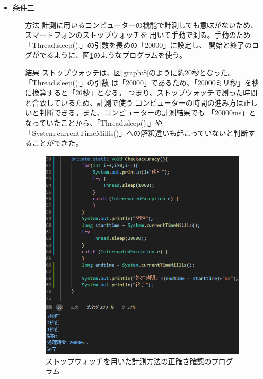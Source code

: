 \begin{enumerate}
\begin{itemize}
\begin{itemize}
\begin{figure}[htbp]
\begin{minipage}[t]{0.45\hsize}
        \end{minipage}
      \end{figure}
    \end{itemize}
    \item 条件三
    \begin{itemize}
      \item[方法] 
      計測に用いるコンピューターの機能で計測しても意味がないため、スマートフォンのストップウォッチを
      用いて手動で測る。手動のため「Thread.sleep();」の引数を長めの「20000」に設定し、
      開始と終了のログがでるように、図\ref{graph:7}のようなプログラムを使う。
      \item[結果] 
      ストップウォッチは、図\ref{graph:8}のように約20秒となった。「Thread.sleep();」の引数
      は「20000」であるため、「20000ミリ秒」を秒に換算すると「20秒」となる。
      つまり、ストップウォッチで測った時間と合致しているため、計測で使う
      コンピューターの時間の進み方は正しいと判断できる。また、コンピューターの計測結果でも
      「20000ms」となっていたことから、「Thread.sleep();」や
      「System.currentTimeMillis()」への解釈違いも起こっていないと判断することができた。
      \begin{figure}[htbp]
        \begin{minipage}[t]{0.5\hsize}
          \centering
          \caption{ストップウォッチを用いた計測方法の正確さ確認のプログラム}
          \label{graph:7}
          \includegraphics[scale=0.4]{計測方法の正確さを確認2.PNG}

\end{minipage}
\end{figure}
\end{itemize}
\end{itemize}
\end{enumerate}
